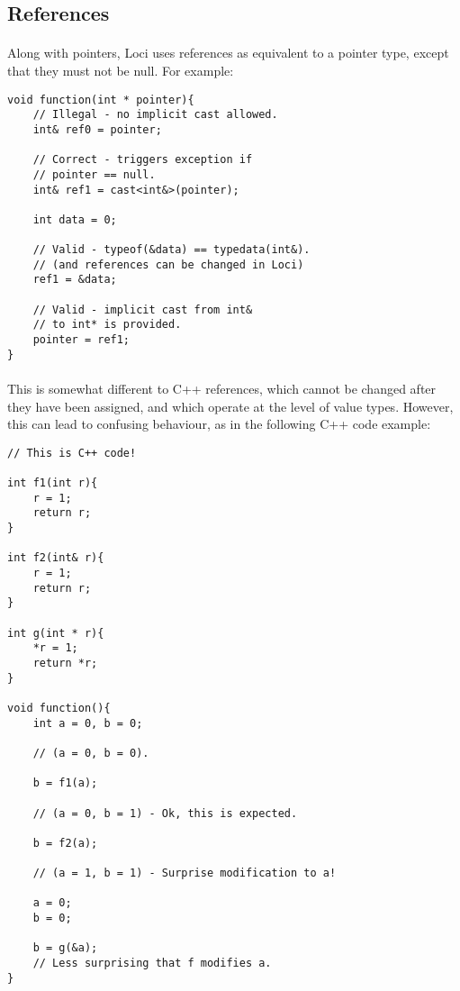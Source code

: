 \documentclass[12pt,twoside,notitlepage]{report}
\begin{document}
\subsection{References}

\paragraph{}
Along with pointers, Loci uses references as equivalent to a pointer type, except that they must not be null. For example:

\small{
\begin{verbatim}
void function(int * pointer){
    // Illegal - no implicit cast allowed.
    int& ref0 = pointer;
    
    // Correct - triggers exception if
    // pointer == null.
    int& ref1 = cast<int&>(pointer);
    
    int data = 0;
    
    // Valid - typeof(&data) == typedata(int&).
    // (and references can be changed in Loci)
    ref1 = &data;
    
    // Valid - implicit cast from int&
    // to int* is provided.
    pointer = ref1;
}
\end{verbatim}
}

\paragraph{}
This is somewhat different to C++ references, which cannot be changed after they have been assigned, and which operate at the level of value types. However, this can lead to confusing behaviour, as in the following C++ code example:

\small{
\begin{verbatim}
// This is C++ code!

int f1(int r){
    r = 1;
    return r;
}

int f2(int& r){
    r = 1;
    return r;
}

int g(int * r){
    *r = 1;
    return *r;
}

void function(){
    int a = 0, b = 0;
    
    // (a = 0, b = 0).
    
    b = f1(a);
    
    // (a = 0, b = 1) - Ok, this is expected.
    
    b = f2(a);
    
    // (a = 1, b = 1) - Surprise modification to a!
    
    a = 0;
    b = 0;
    
    b = g(&a);
    // Less surprising that f modifies a.
}
\end{verbatim}
}
\end{document}
